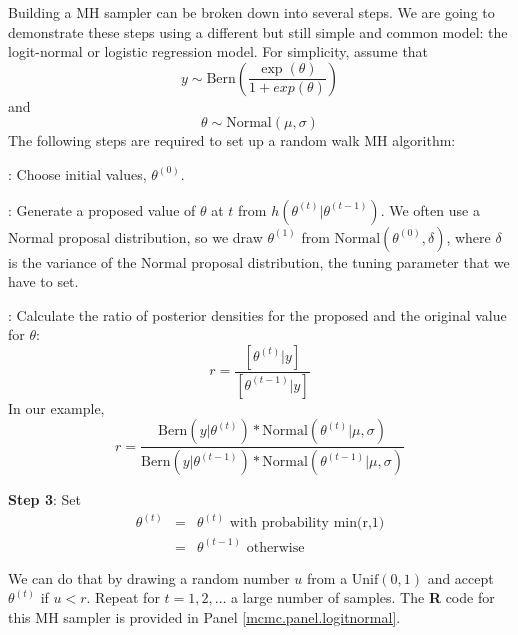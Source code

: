 Building a MH sampler can be broken down into several steps. We are going to demonstrate these steps using a different but still simple and common model: the logit-normal or logistic regression model. For simplicity, assume that
\[
y \sim \mbox{Bern} \left(\frac{\exp(\theta)}{1+ exp(\theta)}\right)
\]
and
\[
\theta \sim \mbox{Normal}(\mu, \sigma)
\]
The following steps are required to set up a random walk MH algorithm:

{: Choose initial values, $\theta^{(0)}$.}

{: Generate a proposed value of $\theta$ at $t$ from $h(\theta^{(t)}|\theta^{(t-1)})$. }
We often use a Normal proposal distribution, so we draw $\theta^{(1)}$ from $\mbox{Normal}(\theta^{(0)}, \delta)$, where $\delta$ is the variance of the Normal proposal distribution, the tuning parameter that we have to set.

{: Calculate the ratio of posterior densities for the proposed and the original value for $\theta$: }
\[
r = \frac{[\theta^{(t)}|y]}  {[\theta^{(t-1)}|y]}
\]
In our example,
\[
r = \frac{\mbox{Bern}(y|\theta^{(t)}) * \mbox{Normal}(\theta^{(t)}|\mu, \sigma)} {\mbox{Bern}(y|\theta^{(t-1)}) * \mbox{Normal}(\theta^{(t-1)}|\mu, \sigma)}
\]


{\bf Step 3}: Set
\begin{eqnarray*}
\theta^{(t)}  &= &   \theta^{(t)} \mbox{ with probability min(r,1)}\\
	 & = & 	\theta^{(t-1)} \mbox{ otherwise }
\end{eqnarray*}



We can do that by drawing a random number $u$ from a
$\mbox{Unif}(0,1)$ and accept $\theta^{(t)}$ if
$u<r$.
Repeat for $t = 1,2,\ldots$ a large number of samples.
The {\bf R} code for this MH sampler is provided in Panel \ref{mcmc.panel.logitnormal}.

